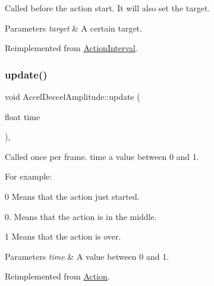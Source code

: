 Called before the action start. It will also set the target.


\begin{DoxyParams}{Parameters}
{\em target} & A certain target. \\
\hline
\end{DoxyParams}


Reimplemented from \hyperlink{classActionInterval_ad3d91186b2c3108488ddbbdbbd982484}{Action\+Interval}.

\mbox{\label{classAccelDeccelAmplitude_abc44a9707cdbf2356e8321d49f651df1}} 
\subsubsection{\texorpdfstring{update()}{update()}\hspace{0.1cm}{\footnotesize\ttfamily [1/2]}}
{\footnotesize\ttfamily void Accel\+Deccel\+Amplitude\+::update (\begin{DoxyParamCaption}\item[{float}]{time }\end{DoxyParamCaption})\hspace{0.3cm}{\ttfamily [override]}, {\ttfamily [virtual]}}

Called once per frame. time a value between 0 and 1.

For example\+:
\begin{DoxyItemize}
\item 0 Means that the action just started.
\item 0. Means that the action is in the middle.
\item 1 Means that the action is over.
\end{DoxyItemize}


\begin{DoxyParams}{Parameters}
{\em time} & A value between 0 and 1. \\
\hline
\end{DoxyParams}


Reimplemented from \hyperlink{classAction_a937e646e63915e33ad05ba149bfcf239}{Action}.

\mbox{\label{classAccelDeccelAmplitude_a50371c814a78e3e01add896e1ec4b56b}} 
